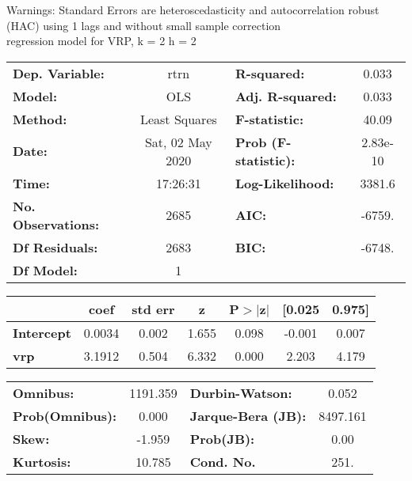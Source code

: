Warnings: \newline
 [1] Standard Errors are heteroscedasticity and autocorrelation robust (HAC) using 1 lags and without small sample correction\\ 

regression model for VRP, k = 2 h = 2\begin{center}
\begin{tabular}{lclc}
\toprule
\textbf{Dep. Variable:}    &       rtrn       & \textbf{  R-squared:         } &     0.033   \\
\textbf{Model:}            &       OLS        & \textbf{  Adj. R-squared:    } &     0.033   \\
\textbf{Method:}           &  Least Squares   & \textbf{  F-statistic:       } &     40.09   \\
\textbf{Date:}             & Sat, 02 May 2020 & \textbf{  Prob (F-statistic):} &  2.83e-10   \\
\textbf{Time:}             &     17:26:31     & \textbf{  Log-Likelihood:    } &    3381.6   \\
\textbf{No. Observations:} &        2685      & \textbf{  AIC:               } &    -6759.   \\
\textbf{Df Residuals:}     &        2683      & \textbf{  BIC:               } &    -6748.   \\
\textbf{Df Model:}         &           1      & \textbf{                     } &             \\
\bottomrule
\end{tabular}
\begin{tabular}{lcccccc}
                   & \textbf{coef} & \textbf{std err} & \textbf{z} & \textbf{P$> |$z$|$} & \textbf{[0.025} & \textbf{0.975]}  \\
\midrule
\textbf{Intercept} &       0.0034  &        0.002     &     1.655  &         0.098        &       -0.001    &        0.007     \\
\textbf{vrp}       &       3.1912  &        0.504     &     6.332  &         0.000        &        2.203    &        4.179     \\
\bottomrule
\end{tabular}
\begin{tabular}{lclc}
\textbf{Omnibus:}       & 1191.359 & \textbf{  Durbin-Watson:     } &    0.052  \\
\textbf{Prob(Omnibus):} &   0.000  & \textbf{  Jarque-Bera (JB):  } & 8497.161  \\
\textbf{Skew:}          &  -1.959  & \textbf{  Prob(JB):          } &     0.00  \\
\textbf{Kurtosis:}      &  10.785  & \textbf{  Cond. No.          } &     251.  \\
\bottomrule
\end{tabular}
\end{center}

